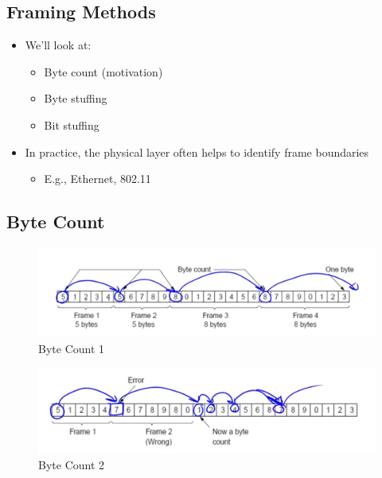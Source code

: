 \documentclass[12pt]{ctexart}   %
\begin{document}
	\subsection{Framing Methods}
	\begin{itemize}
		\item We'll look at:
		\begin{itemize}
			\item Byte count (motivation)
			\item Byte stuffing
			\item Bit stuffing
		\end{itemize}
		
		\item In practice, the physical layer often helps to identify frame boundaries
		\begin{itemize}
			\item E.g., Ethernet, 802.11
		\end{itemize}
	\end{itemize}
	
	\subsection{Byte Count}
	
	\begin{figure}[h!] %
	\centering
	 \includegraphics[scale=0.7]{images/2-7-2}
	\caption{Byte Count 1}
	 \label{fig:2-7-2}
	 \end{figure}
	 
	 \begin{figure}[h!] %
	\centering
	 \includegraphics[scale=0.7]{images/2-7-3}
	\caption{Byte Count 2}
	 \label{fig:2-7-3}
	 \end{figure}
	 
\end{document}
